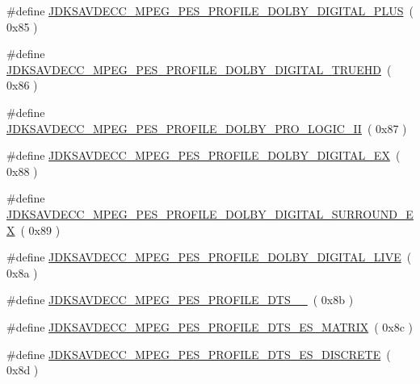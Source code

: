 \begin{DoxyCompactItemize}
\item 
\#define \hyperlink{group__mpeg__pes__profile_ga78ac4ef877ba714648ce8fa6cc9366fc}{J\+D\+K\+S\+A\+V\+D\+E\+C\+C\+\_\+\+M\+P\+E\+G\+\_\+\+P\+E\+S\+\_\+\+P\+R\+O\+F\+I\+L\+E\+\_\+\+D\+O\+L\+B\+Y\+\_\+\+D\+I\+G\+I\+T\+A\+L\+\_\+\+P\+L\+US}~( 0x85 )
\item 
\#define \hyperlink{group__mpeg__pes__profile_ga97155e3123cbc0c255a27440fa3ee8a5}{J\+D\+K\+S\+A\+V\+D\+E\+C\+C\+\_\+\+M\+P\+E\+G\+\_\+\+P\+E\+S\+\_\+\+P\+R\+O\+F\+I\+L\+E\+\_\+\+D\+O\+L\+B\+Y\+\_\+\+D\+I\+G\+I\+T\+A\+L\+\_\+\+T\+R\+U\+E\+HD}~( 0x86 )
\item 
\#define \hyperlink{group__mpeg__pes__profile_ga63d926c250836dbe00387e163a93bd46}{J\+D\+K\+S\+A\+V\+D\+E\+C\+C\+\_\+\+M\+P\+E\+G\+\_\+\+P\+E\+S\+\_\+\+P\+R\+O\+F\+I\+L\+E\+\_\+\+D\+O\+L\+B\+Y\+\_\+\+P\+R\+O\+\_\+\+L\+O\+G\+I\+C\+\_\+\+II}~( 0x87 )
\item 
\#define \hyperlink{group__mpeg__pes__profile_ga57516d602953f5b5308f83aab48bc279}{J\+D\+K\+S\+A\+V\+D\+E\+C\+C\+\_\+\+M\+P\+E\+G\+\_\+\+P\+E\+S\+\_\+\+P\+R\+O\+F\+I\+L\+E\+\_\+\+D\+O\+L\+B\+Y\+\_\+\+D\+I\+G\+I\+T\+A\+L\+\_\+\+EX}~( 0x88 )
\item 
\#define \hyperlink{group__mpeg__pes__profile_ga5459b4987ec102b44f76b56201a6d517}{J\+D\+K\+S\+A\+V\+D\+E\+C\+C\+\_\+\+M\+P\+E\+G\+\_\+\+P\+E\+S\+\_\+\+P\+R\+O\+F\+I\+L\+E\+\_\+\+D\+O\+L\+B\+Y\+\_\+\+D\+I\+G\+I\+T\+A\+L\+\_\+\+S\+U\+R\+R\+O\+U\+N\+D\+\_\+\+EX}~( 0x89 )
\item 
\#define \hyperlink{group__mpeg__pes__profile_ga5ab95e69fbd0135471ad2e77694a149d}{J\+D\+K\+S\+A\+V\+D\+E\+C\+C\+\_\+\+M\+P\+E\+G\+\_\+\+P\+E\+S\+\_\+\+P\+R\+O\+F\+I\+L\+E\+\_\+\+D\+O\+L\+B\+Y\+\_\+\+D\+I\+G\+I\+T\+A\+L\+\_\+\+L\+I\+VE}~( 0x8a )
\item 
\#define \hyperlink{group__mpeg__pes__profile_ga80dc0e4e3b4a19648ce31900918ad905}{J\+D\+K\+S\+A\+V\+D\+E\+C\+C\+\_\+\+M\+P\+E\+G\+\_\+\+P\+E\+S\+\_\+\+P\+R\+O\+F\+I\+L\+E\+\_\+\+D\+T\+S\+\_\+\_}~( 0x8b )
\item 
\#define \hyperlink{group__mpeg__pes__profile_ga4116234752a5006adbc36e8fa0170c6f}{J\+D\+K\+S\+A\+V\+D\+E\+C\+C\+\_\+\+M\+P\+E\+G\+\_\+\+P\+E\+S\+\_\+\+P\+R\+O\+F\+I\+L\+E\+\_\+\+D\+T\+S\+\_\+\+E\+S\+\_\+\+M\+A\+T\+R\+IX}~( 0x8c )
\item 
\#define \hyperlink{group__mpeg__pes__profile_ga0dad20d0ec907ca4577a6cdfe159b920}{J\+D\+K\+S\+A\+V\+D\+E\+C\+C\+\_\+\+M\+P\+E\+G\+\_\+\+P\+E\+S\+\_\+\+P\+R\+O\+F\+I\+L\+E\+\_\+\+D\+T\+S\+\_\+\+E\+S\+\_\+\+D\+I\+S\+C\+R\+E\+TE}~( 0x8d )
\item 

\end{DoxyCompactItemize}
